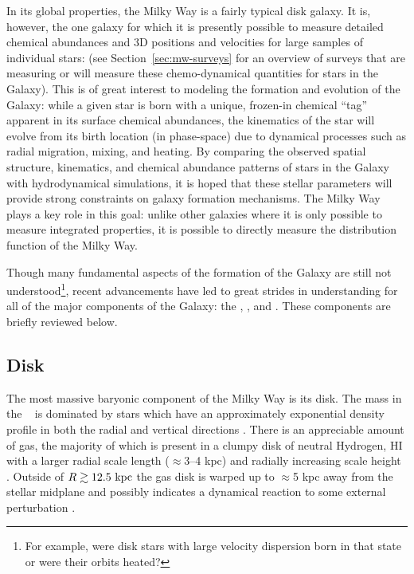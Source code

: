 In its global properties, the Milky Way is a fairly typical disk galaxy. It is,
however, the one galaxy for which it is presently possible to measure detailed
chemical abundances and 3D positions and velocities for large samples of
individual stars: (see Section~\ref{sec:mw-surveys} for an overview of surveys
that are measuring or will measure these chemo-dynamical quantities for stars in
the Galaxy). This is of great interest to modeling the formation and evolution
of the Galaxy: while a given star is born with a unique, frozen-in chemical
``tag'' apparent in its surface chemical abundances, the kinematics of the star
will evolve from its birth location (in phase-space) due to dynamical processes
such as radial migration, mixing, and heating. By comparing the observed spatial
structure, kinematics, and chemical abundance patterns of stars in the Galaxy
with hydrodynamical simulations, it is hoped that these stellar parameters will
provide strong constraints on galaxy formation mechanisms. The Milky Way plays a
key role in this goal: unlike other galaxies where it is only possible to
measure integrated properties, it is possible to directly measure the
distribution function of the Milky Way.

Though many fundamental aspects of the formation of the Galaxy are still not
understood\footnote{For example, were disk stars with large velocity dispersion
born in that state or were their orbits heated?}, recent advancements have led
to great strides in understanding for all of the major components of the Galaxy:
the \mwdisk, \mwbulge, and \mwhalo. These components are briefly reviewed below.

\subsection{Disk}

The most massive baryonic component of the Milky Way is its disk. The mass in
the \mwdisk\ \citep[$M_d \approx 5 \times 10^{10}~\msun$;][]{mcmillan11} is
dominated by stars which have an approximately exponential density profile in
both the radial and vertical directions \citep[with scale lengths of $\approx$2
--3 kpc and $\approx$250--800 pc, respectively, from thin to thick
disk;][]{ojha01, juric08, mcmillan11, bovy12-spatialMAP}. There is an
appreciable amount of gas, the majority of which is present in a clumpy disk of
neutral Hydrogen, HI \citep[$M_{\rm HI} \approx 8 \times
10^9~\msun$;][]{kalberla09} with a larger radial scale length ($\approx$3--4
kpc) and radially increasing scale height \citep[$\approx$100 pc at $R=8~\kpc$
to $\approx$1 kpc at $R=25~\kpc$;][]{wouterloot90, merrifield92}. Outside of $R
\gtrsim 12.5~\mathrm{kpc}$ the gas disk is warped up to $\approx$5 kpc away from the
stellar midplane \citep{henderson82, kalberla07} and possibly indicates a
dynamical reaction to some external perturbation \citep[e.g.,][]{bekki12}.

